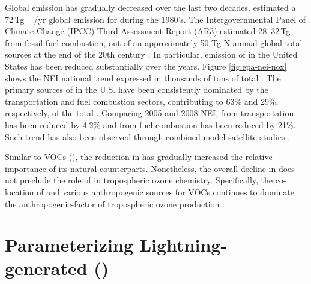 
	Global  emission has gradually decreased over the last two decades. \citet{Muller:1992kx} estimated a 72\,\unit{Tg\,/yr} global emission for during the 1980's.  The Intergovernmental Panel of Climate Change (IPCC) Third Assessment Report (AR3) estimated 28--32\,\unit{Tg}\, from fossil fuel combustion, out of an approximately 50 Tg N annual global total  sources at the end of the 20th century \citep[][ and references therein]{Schumann:2007fk,Lamarque:2010fk}. In particular, emission of {\anox} in the United States has been reduced substantially over the years. Figure \ref{fig:epa-nei-nox} shows the NEI national trend expressed in thousands of tons of total . The primary sources of {\anox} in the U.S. have been consistently dominated by the transportation and fuel combustion sectors, contributing to 63\% and 29\%, respectively, of the total {\anox}. Comparing 2005 and 2008 NEI,  from transportation has been reduced by 4.2\% and  from fuel combustion has been reduced by 21\%. Such trend has also been observed through combined model-satellite studies \citep{Kim:2009cq}.

	Similar to VOCs (), the reduction in {\anox} has gradually increased the relative importance of its natural counterparts. Nonetheless, the overall decline in {\anox} does not preclude the role of {\anox} in tropospheric ozone chemistry. Specifically, the co-location of {\anox} and various anthropogenic sources for VOCs continues to dominate the anthropogenic-factor of tropospheric ozone production \citep[e.g.][]{Kim:2011fk}.


%
%

\section{Parameterizing Lightning-generated  ({\lnox})} \label{sec:intro/lightning}

